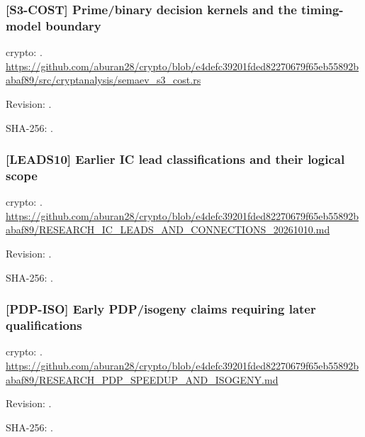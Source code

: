 \par\noindent\begin{minipage}{\linewidth}\small
\subsubsection*{[S3-COST] Prime/binary decision kernels and the timing-model boundary}\label{art:S3-COST}
crypto: .
\url{https://github.com/aburan28/crypto/blob/e4defc39201fded82270679f65eb55892babaf89/src/cryptanalysis/semaev_s3_cost.rs}
\par Revision: .
\par SHA-256: .
\end{minipage}\par\medskip

\par\noindent\begin{minipage}{\linewidth}\small
\subsubsection*{[LEADS10] Earlier IC lead classifications and their logical scope}\label{art:LEADS10}
crypto: .
\url{https://github.com/aburan28/crypto/blob/e4defc39201fded82270679f65eb55892babaf89/RESEARCH_IC_LEADS_AND_CONNECTIONS_20261010.md}
\par Revision: .
\par SHA-256: .
\end{minipage}\par\medskip

\par\noindent\begin{minipage}{\linewidth}\small
\subsubsection*{[PDP-ISO] Early PDP/isogeny claims requiring later qualifications}\label{art:PDP-ISO}
crypto: .
\url{https://github.com/aburan28/crypto/blob/e4defc39201fded82270679f65eb55892babaf89/RESEARCH_PDP_SPEEDUP_AND_ISOGENY.md}
\par Revision: .
\par SHA-256: .
\end{minipage}\par\medskip

